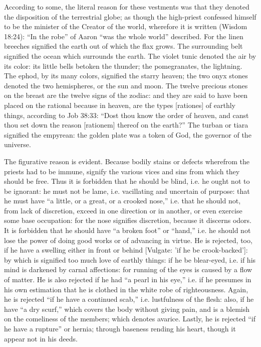 According to some, the literal reason for these vestments was that they denoted the disposition of the terrestrial globe; as though the high-priest confessed himself to be the minister of the Creator of the world, wherefore it is written (Wisdom 18:24): ``In the robe'' of Aaron ``was the whole world'' described. For the linen breeches signified the earth out of which the flax grows. The surrounding belt signified the ocean which surrounds the earth. The violet tunic denoted the air by its color: its little bells betoken the thunder; the pomegranates, the lightning. The ephod, by its many colors, signified the starry heaven; the two onyx stones denoted the two hemispheres, or the sun and moon. The twelve precious stones on the breast are the twelve signs of the zodiac: and they are said to have been placed on the rational because in heaven, are the types [rationes] of earthly things, according to Job 38:33: ``Dost thou know the order of heaven, and canst thou set down the reason [rationem] thereof on the earth?'' The turban or tiara signified the empyrean: the golden plate was a token of God, the governor of the universe.

The figurative reason is evident. Because bodily stains or defects wherefrom the priests had to be immune, signify the various vices and sins from which they should be free. Thus it is forbidden that he should be blind, i.e. he ought not to be ignorant: he must not be lame, i.e. vacillating and uncertain of purpose: that he must have ``a little, or a great, or a crooked nose,'' i.e. that he should not, from lack of discretion, exceed in one direction or in another, or even exercise some base occupation: for the nose signifies discretion, because it discerns odors. It is forbidden that he should have ``a broken foot'' or ``hand,'' i.e. he should not lose the power of doing good works or of advancing in virtue. He is rejected, too, if he have a swelling either in front or behind [Vulgate: 'if he be crook-backed']: by which is signified too much love of earthly things: if he be blear-eyed, i.e. if his mind is darkened by carnal affections: for running of the eyes is caused by a flow of matter. He is also rejected if he had ``a pearl in his eye,'' i.e. if he presumes in his own estimation that he is clothed in the white robe of righteousness. Again, he is rejected ``if he have a continued scab,'' i.e. lustfulness of the flesh: also, if he have ``a dry scurf,'' which covers the body without giving pain, and is a blemish on the comeliness of the members; which denotes avarice. Lastly, he is rejected ``if he have a rupture'' or hernia; through baseness rending his heart, though it appear not in his deeds.

